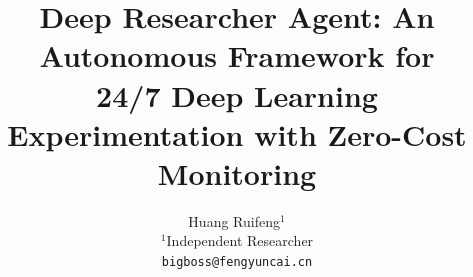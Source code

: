 \documentclass[10pt,twocolumn,letterpaper]{article}
\title{Deep Researcher Agent: An Autonomous Framework for \\24/7 Deep Learning Experimentation with Zero-Cost Monitoring}
\author{
    Huang Ruifeng$^{1}$\\
    $^{1}$Independent Researcher\\
    {\tt\small bigboss@fengyuncai.cn}
}
\begin{document}
\maketitle








{\small


}

\newpage
\appendix

\end{document}

